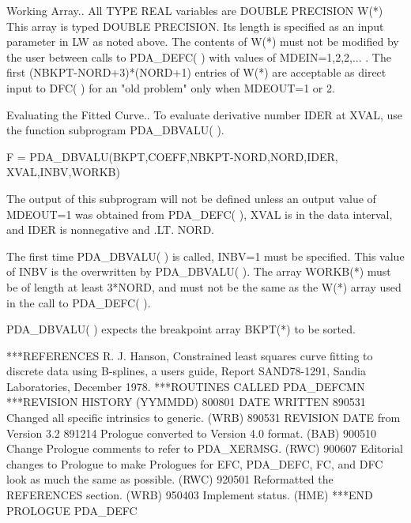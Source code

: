 \documentclass[11pt,twoside,nolof]{starlink}
\begin{document}
\begin{terminalv}
  Working Array.. All TYPE REAL variables are DOUBLE PRECISION
      W(*)
                         This array is typed DOUBLE PRECISION.
                         Its length is  specified as an input parameter
                         in LW as noted above.  The contents of W(*)
                         must not be modified by the user between calls
                         to PDA_DEFC( ) with values of MDEIN=1,2,2,... .
                         The first (NBKPT-NORD+3)*(NORD+1) entries of
                         W(*) are acceptable as direct input to DFC( )
                         for an "old problem" only when MDEOUT=1 or 2.

  Evaluating the
  Fitted Curve..
                         To evaluate derivative number IDER at XVAL,
                         use the function subprogram PDA_DBVALU( ).

                         F = PDA_DBVALU(BKPT,COEFF,NBKPT-NORD,NORD,IDER,
                                      XVAL,INBV,WORKB)

                         The output of this subprogram will not be
                         defined unless an output value of MDEOUT=1
                         was obtained from PDA_DEFC( ), XVAL is in the data
                         interval, and IDER is nonnegative and .LT.
                         NORD.

                         The first time PDA_DBVALU( ) is called, INBV=1
                         must be specified.  This value of INBV is the
                         overwritten by PDA_DBVALU( ).  The array WORKB(*)
                         must be of length at least 3*NORD, and must
                         not be the same as the W(*) array used in the
                         call to PDA_DEFC( ).

                         PDA_DBVALU( ) expects the breakpoint array BKPT(*)
                         to be sorted.

***REFERENCES  R. J. Hanson, Constrained least squares curve fitting
                 to discrete data using B-splines, a users guide,
                 Report SAND78-1291, Sandia Laboratories, December
                 1978.
***ROUTINES CALLED  PDA_DEFCMN
***REVISION HISTORY  (YYMMDD)
   800801  DATE WRITTEN
   890531  Changed all specific intrinsics to generic.  (WRB)
   890531  REVISION DATE from Version 3.2
   891214  Prologue converted to Version 4.0 format.  (BAB)
   900510  Change Prologue comments to refer to PDA_XERMSG.  (RWC)
   900607  Editorial changes to Prologue to make Prologues for EFC,
           PDA_DEFC, FC, and DFC look as much the same as possible.  (RWC)
   920501  Reformatted the REFERENCES section.  (WRB)
   950403  Implement status.  (HME)
***END PROLOGUE  PDA_DEFC
\end{terminalv}
\end{document}
